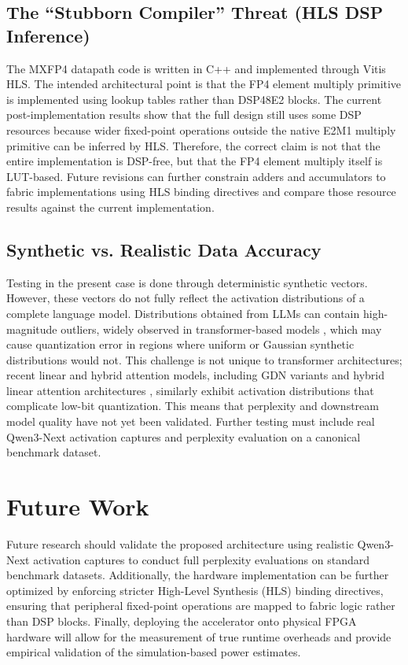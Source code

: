 ﻿\documentclass[conference]{IEEEtran}
\begin{document}
\subsection{The ``Stubborn Compiler'' Threat (HLS DSP Inference)}
The MXFP4 datapath code is written in C++ and implemented through Vitis HLS. The intended architectural point is that the FP4 element multiply primitive is implemented using lookup tables rather than DSP48E2 blocks. The current post-implementation results show that the full design still uses some DSP resources because wider fixed-point operations outside the native E2M1 multiply primitive can be inferred by HLS. Therefore, the correct claim is not that the entire implementation is DSP-free, but that the FP4 element multiply itself is LUT-based. Future revisions can further constrain adders and accumulators to fabric implementations using HLS binding directives and compare those resource results against the current implementation.

\subsection{Synthetic vs. Realistic Data Accuracy}
Testing in the present case is done through deterministic synthetic vectors. However, these vectors do not fully reflect the activation distributions of a complete language model. Distributions obtained from LLMs can contain high-magnitude outliers, widely observed in transformer-based models \cite{b2}, which may cause quantization error in regions where uniform or Gaussian synthetic distributions would not. This challenge is not unique to transformer architectures; recent linear and hybrid attention models, including GDN variants \cite{b3} and hybrid linear attention architectures \cite{b8}, similarly exhibit activation distributions that complicate low-bit quantization. This means that perplexity and downstream model quality have not yet been validated. Further testing must include real Qwen3-Next activation captures and perplexity evaluation on a canonical benchmark dataset.

\section{Future Work}
Future research should validate the proposed architecture using realistic Qwen3-Next activation captures to conduct full perplexity evaluations on standard benchmark datasets.
Additionally, the hardware implementation can be further optimized by enforcing stricter High-Level Synthesis (HLS) binding directives, ensuring that peripheral fixed-point operations are mapped to fabric logic rather than DSP blocks. Finally, deploying the accelerator onto physical FPGA hardware will allow for the measurement of true runtime overheads and provide empirical validation of the simulation-based power estimates.
\end{document}
